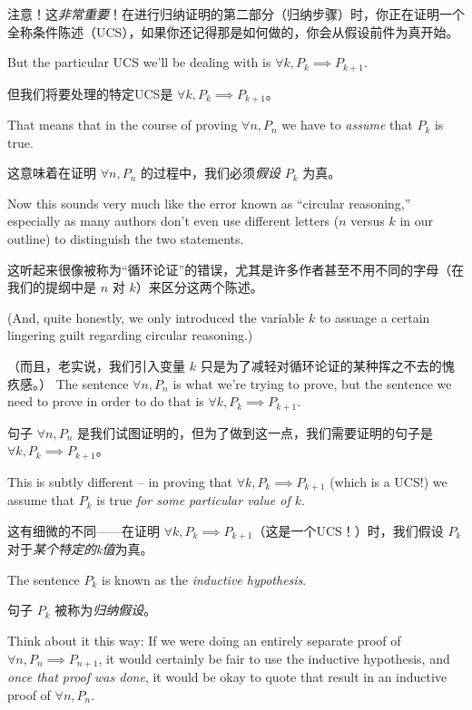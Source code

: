 注意！这\emph{非常重要}！在进行归纳证明的第二部分（归纳步骤）时，你正在证明一个全称条件陈述（UCS），如果你还记得那是如何做的，你会从假设前件为真开始。

But the particular UCS we'll
be dealing with is $\forall k,  P_k \implies P_{k+1}$.

但我们将要处理的特定UCS是 $\forall k,  P_k \implies P_{k+1}$。

That means
that in the course of proving $\forall n,  P_n$ we have to \emph{assume}
 that $P_k$ is true.

这意味着在证明 $\forall n,  P_n$ 的过程中，我们必须\emph{假设} $P_k$ 为真。

Now this sounds very much like the error known
as ``circular reasoning,'' especially as many authors don't even
use different letters ($n$ versus $k$ in our outline) to distinguish
the two statements.

这听起来很像被称为“循环论证”的错误，尤其是许多作者甚至不用不同的字母（在我们的提纲中是 $n$ 对 $k$）来区分这两个陈述。

(And, quite honestly, we only introduced the variable
$k$ to assuage a certain lingering guilt regarding circular reasoning.)

（而且，老实说，我们引入变量 $k$ 只是为了减轻对循环论证的某种挥之不去的愧疚感。）
The sentence $\forall n,  P_n$ is what we're trying to prove, but the
sentence we need to prove in order to do that is $\forall k,  P_k \implies P_{k+1}$.

句子 $\forall n,  P_n$ 是我们试图证明的，但为了做到这一点，我们需要证明的句子是 $\forall k,  P_k \implies P_{k+1}$。

This is subtly different -- in proving that $\forall k,  P_k \implies P_{k+1}$
(which is a UCS!) we assume that $P_k$ is true {\em for some particular value of $k$}.

这有细微的不同——在证明 $\forall k,  P_k \implies P_{k+1}$（这是一个UCS！）时，我们假设 $P_k$ 对于{\em 某个特定的k值}为真。

The sentence $P_k$ is known as the 
\emph{inductive hypothesis}.

句子 $P_k$ 被称为\emph{归纳假设}。

Think about it this way:  If we were doing an entirely separate
proof of $\forall n,  P_n \implies P_{n+1}$, it would certainly be fair
to use the inductive hypothesis, and \emph{once that proof was done}, 
it would be okay to quote that result in an inductive proof of 
$\forall n,  P_n$.

